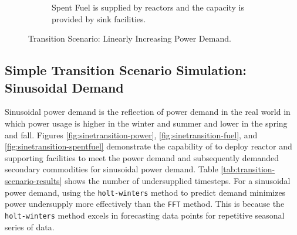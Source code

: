 \begin{figure}[]
\begin{subfigure}[t]{0.6\textwidth}
            \caption{Spent Fuel is supplied by reactors and the capacity is provided by sink facilities.}
            \label{fig:growingtransition-spentfuel}
        \end{subfigure}
        \caption{Transition Scenario: Linearly Increasing Power Demand.}
    \end{figure}
    
    \subsection{Simple Transition Scenario Simulation: Sinusoidal Demand}
    Sinusoidal power demand is the reflection of power demand in 
    the real world in which power usage is higher in the winter and summer
    and lower in the spring and fall. 
    Figures \ref{fig:sinetransition-power}, \ref{fig:sinetransition-fuel},
    and \ref{fig:sinetransition-spentfuel} demonstrate the capability 
    of \deploy to deploy reactor and supporting facilities to meet the
    power demand and subsequently demanded secondary commodities 
    for sinusoidal power demand. 
    Table \ref{tab:transition-scenario-results} shows the number of 
    undersupplied timesteps.
    For a sinusoidal power demand, using the 
    \texttt{holt-winters} method to predict demand minimizes 
    power undersupply more effectively than the \texttt{FFT} method. 
    This is because the \texttt{holt-winters} method excels in
    forecasting data points for repetitive seasonal series of data. 
    
